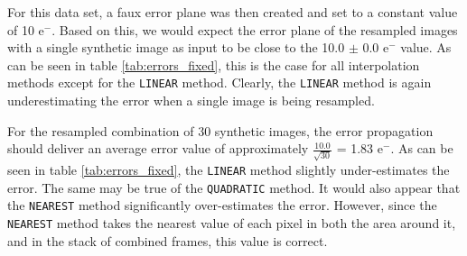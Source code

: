 For this data set,  a faux error plane was then created and set to a constant value of 10 e$^-$. 
Based on this, we would expect the error plane of the resampled images with a single synthetic image as input to
be close to the 10.0 $\pm$ 0.0 e$^-$ value.   As can be seen in table \ref{tab:errors_fixed}, this is the case for all interpolation methods
except for the {\tt LINEAR} method.  Clearly, the {\tt LINEAR} method is again underestimating the error when a single image is being resampled.

For the resampled combination of 30 synthetic images, the error propagation should deliver an average error value of approximately 
$\frac{10.0}{\sqrt{30}}$ = 1.83 e$^-$.  As can be seen in table \ref{tab:errors_fixed}, the {\tt LINEAR} method slightly under-estimates the error.
The same may be true of the {\tt QUADRATIC} method.
It would also appear that the {\tt NEAREST} method significantly over-estimates the error.
However, since the {\tt NEAREST} method takes the nearest value of each pixel in both the area around it, and in the stack of combined frames, this
value is correct.  



